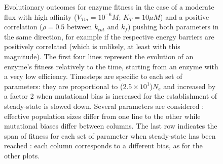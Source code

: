 \begin{figure}[H]
\begin{center}
\vspace{-0.1cm}
\caption{\small Evolutionary outcomes for enzyme fitness in the case of a moderate flux with high affinity ($V_{Tm}=10^{-6}M$; $K_T=10\mu M$) and a positive correlation ($\rho=0.5$ between $k_{cat}$ and $k_f$) pushing both parameters in the same direction, for example if the respective energy barriers are positively correlated (which is unlikely, at least with this magnitude). The first four lines represent the evolution of an enzyme's fitness relatively to the time, starting from an enzyme with a very low efficiency. Timesteps are specific to each set of parameters: they are proportional to ($2.5\times 10^1$)$N_e$ and increased by a factor 2 when mutational bias is increased for the establishment of steady-state is slowed down. Several parameters are considered : effective population sizes differ from one line to the other while mutational biases differ between columns. The last row indicates the span of fitness for each set of parameter when steady-state has been reached : each column corresponds to a different bias, as for the other plots.\normalsize}
\label{fig6c-ann}
\end{center}
\end{figure}

